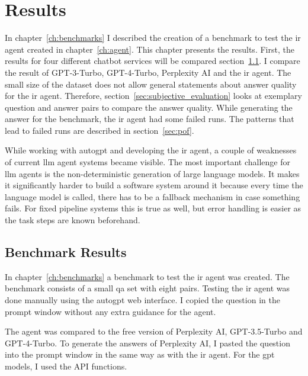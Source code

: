 \documentclass[../main.tex]{subfiles}
\begin{document}
\chapter{Results}
\label{ch:results}

In chapter~\ref{ch:benchmarks} I described the creation of a benchmark
to test the \gls{ir} agent created in chapter~\ref{ch:agent}.
This chapter presents the results.
First, the results for four different chatbot services will be compared
section~\ref{sec:benchmark_results}.
I compare the result of GPT-3-Turbo, GPT-4-Turbo, Perplexity AI and the \gls{ir}
agent.
The small size of the dataset does not allow general statements about
answer quality for the \gls{ir} agent.
Therefore, section~\ref{sec:subjective_evaluation} looks at exemplary question and answer
pairs to compare the answer quality.
While generating the answer for the benchmark, the \gls{ir} agent had some failed runs.
The patterns that lead to failed runs are described in section~\ref{sec:pof}.

While working with \gls{autogpt} and developing the \gls{ir} agent,
a couple of weaknesses of current \gls{llm} agent systems became visible.
The most important challenge for \gls{llm} agents is the non-deterministic generation of large language models.
It makes it significantly harder to build a software system around it because every time the language model is called,
there has to be a fallback mechanism in case something fails.
For fixed pipeline systems this is true as well,
but error handling is easier as the task steps are known beforehand.

\section{Benchmark Results}
\label{sec:benchmark_results}

In chapter~\ref{ch:benchmarks} a benchmark to test the \gls{ir} agent was created.
The benchmark consists of a small \gls{qa} set with eight pairs.
Testing the \gls{ir} agent was done manually using the \gls{autogpt} web interface.
I copied the question in the prompt window without any extra guidance for the agent.

The agent was compared to the free version of Perplexity AI,
GPT-3.5-Turbo and GPT-4-Turbo.
To generate the answers of Perplexity AI, I pasted the question into the prompt window in the
same way as with the \gls{ir} agent.
For the \gls{gpt} models, I used the API functions.
\end{document}
